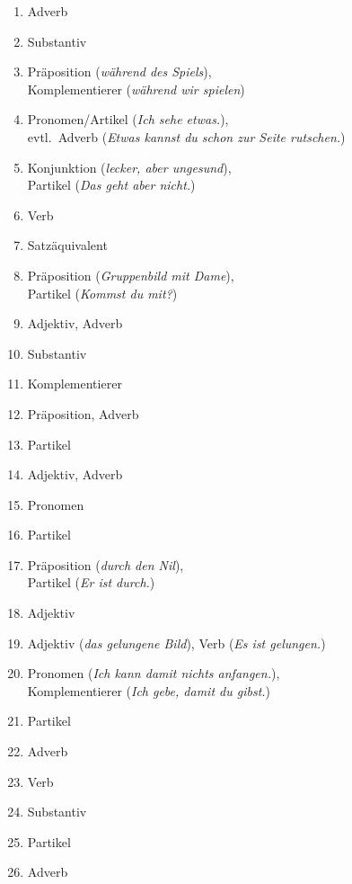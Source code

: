 \begin{enumerate}\Lf
  \item Adverb
  \item Substantiv
  \item Präposition (\textit{während des Spiels}),\\
    Komplementierer (\textit{während wir spielen})
  \item Pronomen\slash Artikel (\textit{Ich sehe etwas.}),\\
    evtl.\ Adverb (\textit{Etwas kannst du schon zur Seite rutschen.})
  \item Konjunktion (\textit{lecker, aber ungesund}),\\
    Partikel (\textit{Das geht aber nicht.})
  \item Verb
  \item Satzäquivalent
  \item Präposition (\textit{Gruppenbild mit Dame}),\\
    Partikel (\textit{Kommst du mit?})
  \item Adjektiv, Adverb
  \item Substantiv
  \item Komplementierer
  \item Präposition, Adverb
  \item Partikel
  \item Adjektiv, Adverb
  \item Pronomen
  \item Partikel
  \item Präposition (\textit{durch den Nil}),\\
    Partikel (\textit{Er ist durch.})
  \item Adjektiv
  \item Adjektiv (\textit{das gelungene Bild}), Verb (\textit{Es ist gelungen.})
  \item Pronomen (\textit{Ich kann damit nichts anfangen.}),\\
    Komplementierer (\textit{Ich gebe, damit du gibst.})
  \item Partikel
  \item Adverb
  \item Verb
  \item Substantiv
  \item Partikel
  \item Adverb
\end{enumerate}




